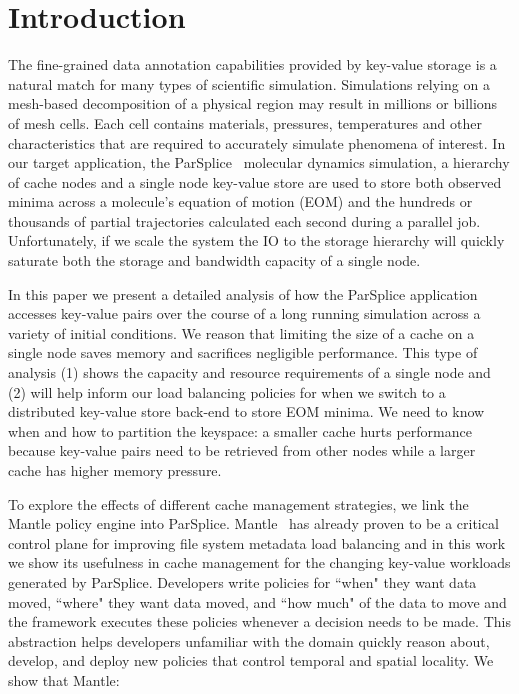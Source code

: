 \section{Introduction}

The fine-grained data annotation capabilities provided by key-value storage is
a natural match for many types of scientific simulation. Simulations relying on
a mesh-based decomposition of a physical region may result in millions or
billions of mesh cells. Each cell contains materials, pressures, temperatures
and other characteristics that are required to accurately simulate phenomena of
interest. In our target application, the
ParSplice~\cite{perez:jctc20150parsplice} molecular dynamics simulation, a
hierarchy of cache nodes and a single node key-value store are used to store
both observed minima across a molecule's equation of motion (EOM) and the
hundreds or thousands of partial trajectories calculated each second during a
parallel job. Unfortunately, if we scale the system the IO to the storage
hierarchy will quickly saturate both the storage and bandwidth capacity of a
single node. 

In this paper we present a detailed analysis of how the ParSplice application
accesses key-value pairs over the course of a long running simulation across a
variety of initial conditions. We reason that limiting the size of a cache on a
single node saves memory and sacrifices negligible performance. This type of
analysis (1) shows the capacity and resource requirements of a single node and
(2) will help inform our load balancing policies for when we switch to a
distributed key-value store back-end to store EOM minima. We need to know when
and how to partition the keyspace: a smaller cache hurts performance because
key-value pairs need to be retrieved from other nodes while a larger cache has
higher memory pressure.

To explore the effects of different cache management strategies, we link the
Mantle policy engine into ParSplice.  Mantle~\cite{sevilla:sc15-mantle} has
already proven to be a critical control plane for improving file system
metadata load balancing  and in this work we show its usefulness in cache
management for the changing key-value workloads generated by ParSplice.
Developers write policies for ``when" they want data moved, ``where" they want
data moved, and ``how much" of the data to move and the framework executes
these policies whenever a decision needs to be made.  This abstraction helps
developers unfamiliar with the domain quickly reason about, develop, and deploy
new policies that control temporal and spatial locality. We show that Mantle:

